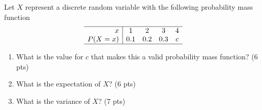 

\item Let $X$ represent a discrete random variable with the following probability mass function
\[ \begin{array}{r|cccc}
\hline
x      & 1 & 2 & 3 & 4 \\
P(X=x) & 0.1 & 0.2 & 0.3 & c \\
\hline
\end{array} \]

\begin{enumerate}

\item What is the value for $c$ that makes this a valid probability mass function? (6 pts)

\vfill

\item What is the expectation of $X$? (6 pts)

\ansfont{
\[ \begin{array}{rl}
E[X] &= \sum_{x=1}^4 x \cdot P(X=x) \\
&= 1\times 0.1 + 2\times 0.2 + 3\times 0.3 + 4\times 0.4 \\
&= 0.1+0.4+0.9+1.6 \\
&= 3
\end{array} \]
}
\vfill

\item What is the variance of $X$? (7 pts)

\ansfont{
\[ \begin{array}{rl}
Var[X] &= \sum_{x=1}^4 (x-\mu)^2 P(X=x) \\
& = (1-3)^2\times 0.1 + (2-3)^2\times 0.2 + (3-3)^2\times 0.3 + (4-3)^2\times 0.4 \\
& = 4\times 0.1+1\times 0.2+0\times 0.3+1\times 0.4 \\
&= 0.4+0.2+0+0.4 = 1
\end{array} \]
}
\vfill

\end{enumerate}
